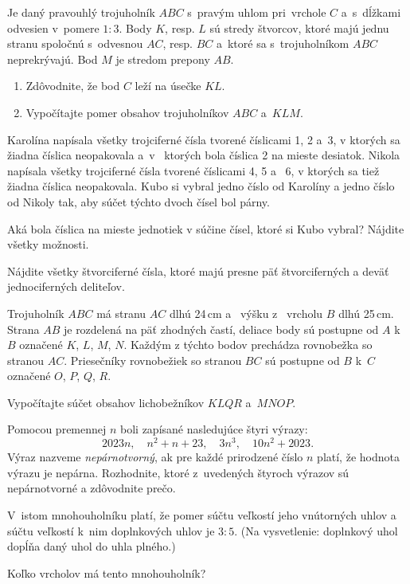 {%
Je daný pravouhlý trojuholník $ABC$ s~pravým uhlom pri~vrchole $C$ a~s~dĺžkami odvesien v~pomere $1:3$.
Body $K$, resp. $L$ sú stredy štvorcov, ktoré majú jednu stranu spoločnú s~odvesnou $AC$, resp. $BC$ a~ktoré sa s~trojuholníkom $ABC$ neprekrývajú.
Bod $M$ je stredom prepony $AB$.

\begin{enumerate}\alphatrue
\item Zdôvodnite, že bod $C$ leží na úsečke $KL$.
\item Vypočítajte pomer obsahov trojuholníkov $ABC$ a~$KLM$.
\end{enumerate}
}

{%
Karolína napísala všetky trojciferné čísla tvorené číslicami 1, 2 a~3, v ktorých sa žiadna číslica neopakovala a~v~ ktorých bola číslica 2 na mieste desiatok.
Nikola napísala všetky trojciferné čísla tvorené číslicami 4, 5 a ~6, v ktorých sa tiež žiadna číslica neopakovala.
Kubo si vybral jedno číslo od Karolíny a jedno číslo od Nikoly tak, aby súčet týchto dvoch čísel bol párny.

Aká bola číslica na mieste jednotiek v súčine čísel, ktoré si Kubo vybral?
Nájdite všetky možnosti.}

{%
Nájdite všetky štvorciferné čísla, ktoré majú presne päť štvorciferných a deväť jednociferných deliteľov.}

{%
Trojuholník $ABC$ má stranu $AC$ dlhú 24\,cm a ~výšku z ~vrcholu $B$ dlhú 25\,cm.
Strana $AB$ je rozdelená na päť zhodných častí, deliace body sú postupne od $A$ k~$B$ označené $K$, $L$, $M$, $N$.
Každým z týchto bodov prechádza rovnobežka so stranou $AC$.
Priesečníky rovnobežiek so stranou $BC$ sú postupne od $B$ k~$C$ označené $O$, $P$, $Q$, $R$.

Vypočítajte súčet obsahov lichobežníkov $KLQR$ a~$MNOP$.}

{%
Pomocou premennej $n$ boli zapísané nasledujúce štyri výrazy:
$$
2023n, \quad n^2+n+23, \quad 3n^3, \quad 10n^2+2023.
$$
Výraz nazveme \emph{nepárnotvorný}, ak pre každé prirodzené číslo $n$ platí, že hodnota výrazu je nepárna.
Rozhodnite, ktoré z~uvedených štyroch výrazov sú nepárnotvorné a zdôvodnite prečo.}

{%
V~istom mnohouholníku platí, že pomer súčtu veľkostí jeho vnútorných uhlov a súčtu veľkostí k~nim doplnkových uhlov je $3:5$.
(Na vysvetlenie: doplnkový uhol dopĺňa daný uhol do uhla plného.)

Koľko vrcholov má tento mnohouholník?}

